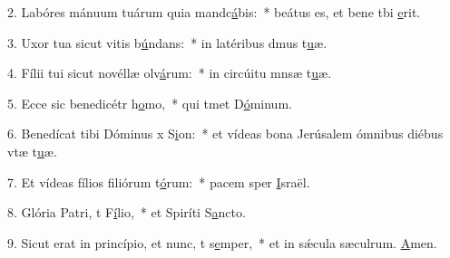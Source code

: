 2. Labóres mánuum tuárum quia mandc\uline{á}bis:~* beátus es, et bene tbi \uline{e}rit.\par 
3. Uxor tua sicut vitis b\uline{ú}ndans:~* in latéribus dmus t\uline{u}æ.\par 
4. Fílii tui sicut novéllæ olv\uline{á}rum:~* in circúitu mnsæ t\uline{u}æ.\par 
5. Ecce sic benedicétr h\uline{o}mo,~* qui tmet D\uline{ó}minum.\par 
6. Benedícat tibi Dóminus x S\uline{i}on:~* et vídeas bona Jerúsalem ómnibus diébus vtæ t\uline{u}æ.\par 
7. Et vídeas fílios filiórum t\uline{ó}rum:~* pacem sper \uline{I}sraël.\par 
8. Glória Patri, t F\uline{í}lio,~* et Spiríti S\uline{a}ncto.\par 
9. Sicut erat in princípio, et nunc, t s\uline{e}mper,~* et in sǽcula sæculrum. \uline{A}men.\par 

